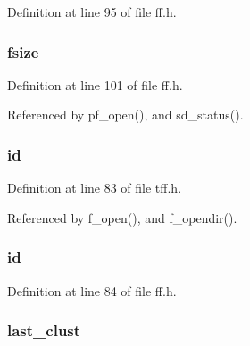 Definition at line 95 of file ff.\-h.

\hypertarget{struct_f_a_t_f_s_af70a0afd16367837984d6205cbfca308}{
\subsubsection[{fsize}]{ fsize}}\label{struct_f_a_t_f_s_af70a0afd16367837984d6205cbfca308}


Definition at line 101 of file ff.\-h.



Referenced by pf\-\_\-open(), and sd\-\_\-status().

\hypertarget{struct_f_a_t_f_s_a588688f55d57bf8a7e8c1d2cf88a3c56}{
\subsubsection[{id}]{ id}}\label{struct_f_a_t_f_s_a588688f55d57bf8a7e8c1d2cf88a3c56}


Definition at line 83 of file tff.\-h.



Referenced by f\-\_\-open(), and f\-\_\-opendir().

\hypertarget{struct_f_a_t_f_s_a7b7a6396b2c82ad46c6d8b2bf141a8dd}{
\subsubsection[{id}]{ id}}\label{struct_f_a_t_f_s_a7b7a6396b2c82ad46c6d8b2bf141a8dd}


Definition at line 84 of file ff.\-h.

\hypertarget{struct_f_a_t_f_s_a07b2a137b54c6c95ffcee006c8906429}{
\subsubsection[{last\-\_\-clust}]{ last\-\_\-clust}}\label{struct_f_a_t_f_s_a07b2a137b54c6c95ffcee006c8906429}


